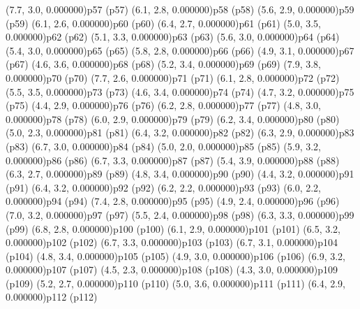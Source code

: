 \psPoint(7.7, 3.0, 0.000000){p57}
\psdot(p57)
\psPoint(6.1, 2.8, 0.000000){p58}
\psdot(p58)
\psPoint(5.6, 2.9, 0.000000){p59}
\psdot(p59)
\psPoint(6.1, 2.6, 0.000000){p60}
\psdot(p60)
\psPoint(6.4, 2.7, 0.000000){p61}
\psdot(p61)
\psPoint(5.0, 3.5, 0.000000){p62}
\psdot(p62)
\psPoint(5.1, 3.3, 0.000000){p63}
\psdot(p63)
\psPoint(5.6, 3.0, 0.000000){p64}
\psdot(p64)
\psPoint(5.4, 3.0, 0.000000){p65}
\psdot(p65)
\psPoint(5.8, 2.8, 0.000000){p66}
\psdot(p66)
\psPoint(4.9, 3.1, 0.000000){p67}
\psdot(p67)
\psPoint(4.6, 3.6, 0.000000){p68}
\psdot(p68)
\psPoint(5.2, 3.4, 0.000000){p69}
\psdot(p69)
\psPoint(7.9, 3.8, 0.000000){p70}
\psdot(p70)
\psPoint(7.7, 2.6, 0.000000){p71}
\psdot(p71)
\psPoint(6.1, 2.8, 0.000000){p72}
\psdot(p72)
\psPoint(5.5, 3.5, 0.000000){p73}
\psdot(p73)
\psPoint(4.6, 3.4, 0.000000){p74}
\psdot(p74)
\psPoint(4.7, 3.2, 0.000000){p75}
\psdot(p75)
\psPoint(4.4, 2.9, 0.000000){p76}
\psdot(p76)
\psPoint(6.2, 2.8, 0.000000){p77}
\psdot(p77)
\psPoint(4.8, 3.0, 0.000000){p78}
\psdot(p78)
\psPoint(6.0, 2.9, 0.000000){p79}
\psdot(p79)
\psPoint(6.2, 3.4, 0.000000){p80}
\psdot(p80)
\psPoint(5.0, 2.3, 0.000000){p81}
\psdot(p81)
\psPoint(6.4, 3.2, 0.000000){p82}
\psdot(p82)
\psPoint(6.3, 2.9, 0.000000){p83}
\psdot(p83)
\psPoint(6.7, 3.0, 0.000000){p84}
\psdot(p84)
\psPoint(5.0, 2.0, 0.000000){p85}
\psdot(p85)
\psPoint(5.9, 3.2, 0.000000){p86}
\psdot(p86)
\psPoint(6.7, 3.3, 0.000000){p87}
\psdot(p87)
\psPoint(5.4, 3.9, 0.000000){p88}
\psdot(p88)
\psPoint(6.3, 2.7, 0.000000){p89}
\psdot(p89)
\psPoint(4.8, 3.4, 0.000000){p90}
\psdot(p90)
\psPoint(4.4, 3.2, 0.000000){p91}
\psdot(p91)
\psPoint(6.4, 3.2, 0.000000){p92}
\psdot(p92)
\psPoint(6.2, 2.2, 0.000000){p93}
\psdot(p93)
\psPoint(6.0, 2.2, 0.000000){p94}
\psdot(p94)
\psPoint(7.4, 2.8, 0.000000){p95}
\psdot(p95)
\psPoint(4.9, 2.4, 0.000000){p96}
\psdot(p96)
\psPoint(7.0, 3.2, 0.000000){p97}
\psdot(p97)
\psPoint(5.5, 2.4, 0.000000){p98}
\psdot(p98)
\psPoint(6.3, 3.3, 0.000000){p99}
\psdot(p99)
\psPoint(6.8, 2.8, 0.000000){p100}
\psdot(p100)
\psPoint(6.1, 2.9, 0.000000){p101}
\psdot(p101)
\psPoint(6.5, 3.2, 0.000000){p102}
\psdot(p102)
\psPoint(6.7, 3.3, 0.000000){p103}
\psdot(p103)
\psPoint(6.7, 3.1, 0.000000){p104}
\psdot(p104)
\psPoint(4.8, 3.4, 0.000000){p105}
\psdot(p105)
\psPoint(4.9, 3.0, 0.000000){p106}
\psdot(p106)
\psPoint(6.9, 3.2, 0.000000){p107}
\psdot(p107)
\psPoint(4.5, 2.3, 0.000000){p108}
\psdot(p108)
\psPoint(4.3, 3.0, 0.000000){p109}
\psdot(p109)
\psPoint(5.2, 2.7, 0.000000){p110}
\psdot(p110)
\psPoint(5.0, 3.6, 0.000000){p111}
\psdot(p111)
\psPoint(6.4, 2.9, 0.000000){p112}
\psdot(p112)
